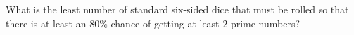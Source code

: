 What is the least number of standard six-sided dice that must be rolled so that there is at least an $80\%$ chance of getting at least $2$ prime numbers?

